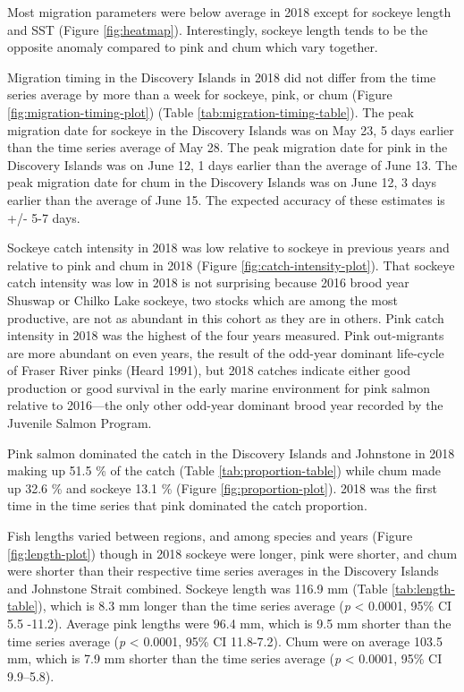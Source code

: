 \documentclass[fleqn,10pt]{wlpeerj} %
\begin{document}
Most migration parameters were below average in 2018 except for sockeye length and SST (Figure \ref{fig:heatmap}). Interestingly, sockeye length tends to be the opposite anomaly compared to pink and chum which vary together.

Migration timing in the Discovery Islands in 2018 did not differ from the time series average by more than a week for sockeye, pink, or chum (Figure \ref{fig:migration-timing-plot}) (Table \ref{tab:migration-timing-table}). The peak migration date for sockeye in the Discovery Islands was on May 23, 5 days earlier than the time series average of May 28. The peak migration date for pink in the Discovery Islands was on June 12, 1 days earlier than the average of June 13. The peak migration date for chum in the Discovery Islands was on June 12, 3 days earlier than the average of June 15. The expected accuracy of these estimates is +/- 5-7 days.

Sockeye catch intensity in 2018 was low relative to sockeye in previous years and relative to pink and chum in 2018 (Figure \ref{fig:catch-intensity-plot}). That sockeye catch intensity was low in 2018 is not surprising because 2016 brood year Shuswap or Chilko Lake sockeye, two stocks which are among the most productive, are not as abundant in this cohort as they are in others. Pink catch intensity in 2018 was the highest of the four years measured. Pink out-migrants are more abundant on even years, the result of the odd-year dominant life-cycle of Fraser River pinks (Heard 1991), but 2018 catches indicate either good production or good survival in the early marine environment for pink salmon relative to 2016---the only other odd-year dominant brood year recorded by the Juvenile Salmon Program.

Pink salmon dominated the catch in the Discovery Islands and Johnstone in 2018 making up 51.5 \% of the catch (Table \ref{tab:proportion-table}) while chum made up 32.6 \% and sockeye 13.1 \% (Figure \ref{fig:proportion-plot}). 2018 was the first time in the time series that pink dominated the catch proportion.

Fish lengths varied between regions, and among species and years (Figure \ref{fig:length-plot}) though in 2018 sockeye were longer, pink were shorter, and chum were shorter than their respective time series averages in the Discovery Islands and Johnstone Strait combined. Sockeye length was 116.9 mm (Table \ref{tab:length-table}), which is 8.3 mm longer than the time series average (\emph{p} \textless{} 0.0001, 95\% CI 5.5 -11.2). Average pink lengths were 96.4 mm, which is 9.5 mm shorter than the time series average (\emph{p} \textless{} 0.0001, 95\% CI 11.8-7.2). Chum were on average 103.5 mm, which is 7.9 mm shorter than the time series average (\emph{p} \textless{} 0.0001, 95\% CI 9.9--5.8).
\end{document}
